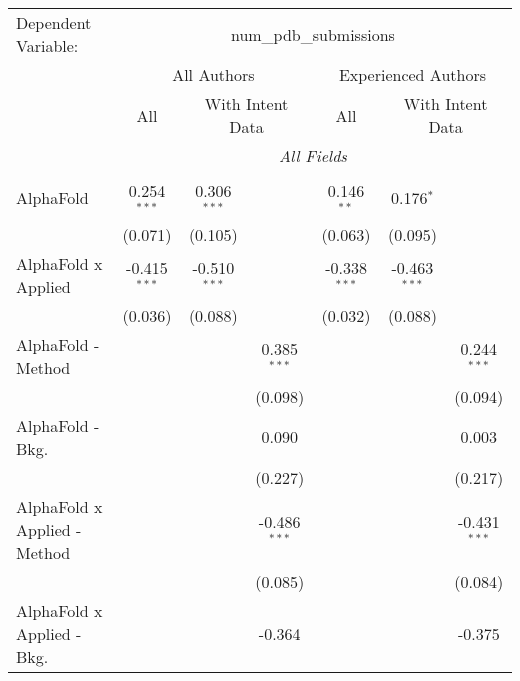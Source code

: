\begingroup
\centering
\begin{tabular}{lcccccc}
   \tabularnewline \midrule \midrule
   Dependent Variable: & \multicolumn{6}{c}{num\_pdb\_submissions}\\
 & \multicolumn{3}{c}{All Authors} & \multicolumn{3}{c}{Experienced Authors} \\
\cmidrule(lr){2-4} \cmidrule(lr){5-7}
 & \multicolumn{1}{c}{All} & \multicolumn{2}{c}{With Intent Data} & \multicolumn{1}{c}{All} & \multicolumn{2}{c}{With Intent Data} \\
\cmidrule(lr){2-2} \cmidrule(lr){3-4} \cmidrule(lr){5-5} \cmidrule(lr){6-7}
 & \multicolumn{6}{c}{\textit{All Fields}} \\ \\
   AlphaFold                      & 0.254$^{***}$  & 0.306$^{***}$  &                & 0.146$^{**}$   & 0.176$^{*}$    &   \\   
                                  & (0.071)        & (0.105)        &                & (0.063)        & (0.095)        &   \\   
   AlphaFold x Applied            & -0.415$^{***}$ & -0.510$^{***}$ &                & -0.338$^{***}$ & -0.463$^{***}$ &   \\   
                                  & (0.036)        & (0.088)        &                & (0.032)        & (0.088)        &   \\   
   AlphaFold - Method             &                &                & 0.385$^{***}$  &                &                & 0.244$^{***}$\\   
                                  &                &                & (0.098)        &                &                & (0.094)\\   
   AlphaFold - Bkg.               &                &                & 0.090          &                &                & 0.003\\   
                                  &                &                & (0.227)        &                &                & (0.217)\\   
   AlphaFold x Applied - Method   &                &                & -0.486$^{***}$ &                &                & -0.431$^{***}$\\   
                                  &                &                & (0.085)        &                &                & (0.084)\\   
   AlphaFold x Applied - Bkg.     &                &                & -0.364         &                &                & -0.375\\   

\end{tabular}
